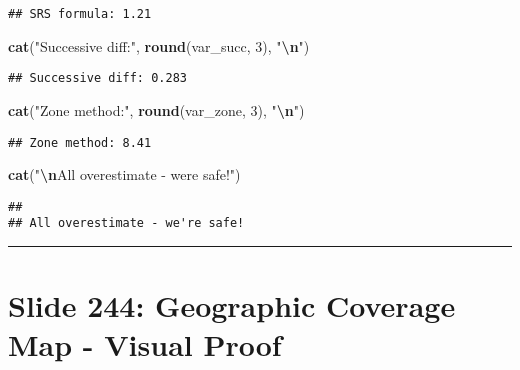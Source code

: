 \documentclass[
]{article}
\newenvironment{Shaded}{\begin{snugshade}}{\end{snugshade}}
\newcommand{\DecValTok}[1]{\textcolor[rgb]{0.00,0.00,0.81}{#1}}
\newcommand{\FunctionTok}[1]{\textcolor[rgb]{0.13,0.29,0.53}{\textbf{#1}}}
\newcommand{\NormalTok}[1]{#1}
\newcommand{\SpecialCharTok}[1]{\textcolor[rgb]{0.81,0.36,0.00}{\textbf{#1}}}
\newcommand{\StringTok}[1]{\textcolor[rgb]{0.31,0.60,0.02}{#1}}
\begin{document}
\begin{verbatim}
## SRS formula: 1.21
\end{verbatim}

\begin{Shaded}
\begin{Highlighting}[]
\FunctionTok{cat}\NormalTok{(}\StringTok{"Successive diff:"}\NormalTok{, }\FunctionTok{round}\NormalTok{(var\_succ, }\DecValTok{3}\NormalTok{), }\StringTok{"}\SpecialCharTok{\textbackslash{}n}\StringTok{"}\NormalTok{)}
\end{Highlighting}
\end{Shaded}

\begin{verbatim}
## Successive diff: 0.283
\end{verbatim}

\begin{Shaded}
\begin{Highlighting}[]
\FunctionTok{cat}\NormalTok{(}\StringTok{"Zone method:"}\NormalTok{, }\FunctionTok{round}\NormalTok{(var\_zone, }\DecValTok{3}\NormalTok{), }\StringTok{"}\SpecialCharTok{\textbackslash{}n}\StringTok{"}\NormalTok{)}
\end{Highlighting}
\end{Shaded}

\begin{verbatim}
## Zone method: 8.41
\end{verbatim}

\begin{Shaded}
\begin{Highlighting}[]
\FunctionTok{cat}\NormalTok{(}\StringTok{"}\SpecialCharTok{\textbackslash{}n}\StringTok{All overestimate {-} we\textquotesingle{}re safe!"}\NormalTok{)}
\end{Highlighting}
\end{Shaded}

\begin{verbatim}
## 
## All overestimate - we're safe!
\end{verbatim}

\begin{center}\rule{0.5\linewidth}{0.5pt}\end{center}

\section{Slide 244: Geographic Coverage Map - Visual
Proof}\label{slide-244-geographic-coverage-map---visual-proof}
\end{document}
